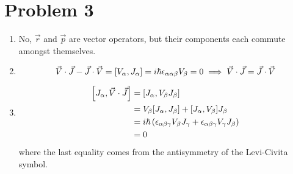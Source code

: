 \documentclass[12pt]{article}
\begin{document}
\section*{Problem 3}
\begin{enumerate}[label=(\alph*)]
    \item No, $\vec{r}$ and $\vec{p}$ are vector operators, but their components each commute amongst themselves.
    \item \[ \vec{V}\cdot\vec{J} - \vec{J}\cdot\vec{V} = \comm{V_\alpha}{J_\alpha} = i\hbar\epsilon_{\alpha\alpha\beta}V_\beta = 0 \implies \vec{V}\cdot\vec{J} = \vec{J}\cdot\vec{V} \]
    \item
    \begin{align*}
        \comm{J_\alpha}{\vec{V}\cdot\vec{J}} &= \comm{J_\alpha}{V_\beta J_\beta} \\
        &= V_\beta\comm{J_\alpha}{J_\beta} + \comm{J_\alpha}{V_\beta}J_\beta \\
        &= i\hbar\left(\epsilon_{\alpha\beta\gamma}V_\beta J_\gamma + \epsilon_{\alpha\beta\gamma}V_\gamma J_\beta\right) \\
        &= 0
    \end{align*}
    where the last equality comes from the antisymmetry of the Levi-Civita symbol.
    

\end{enumerate}
\end{document}
